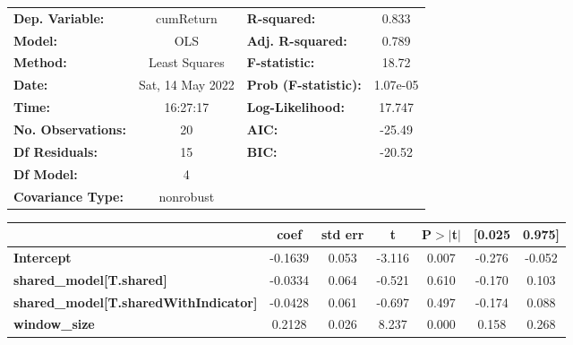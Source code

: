 \begin{center}
\begin{tabular}{lclc}
\toprule
\textbf{Dep. Variable:}                       &    cumReturn     & \textbf{  R-squared:         } &     0.833   \\
\textbf{Model:}                               &       OLS        & \textbf{  Adj. R-squared:    } &     0.789   \\
\textbf{Method:}                              &  Least Squares   & \textbf{  F-statistic:       } &     18.72   \\
\textbf{Date:}                                & Sat, 14 May 2022 & \textbf{  Prob (F-statistic):} &  1.07e-05   \\
\textbf{Time:}                                &     16:27:17     & \textbf{  Log-Likelihood:    } &    17.747   \\
\textbf{No. Observations:}                    &          20      & \textbf{  AIC:               } &    -25.49   \\
\textbf{Df Residuals:}                        &          15      & \textbf{  BIC:               } &    -20.52   \\
\textbf{Df Model:}                            &           4      & \textbf{                     } &             \\
\textbf{Covariance Type:}                     &    nonrobust     & \textbf{                     } &             \\
\bottomrule
\end{tabular}
\begin{tabular}{lcccccc}
                                              & \textbf{coef} & \textbf{std err} & \textbf{t} & \textbf{P$> |$t$|$} & \textbf{[0.025} & \textbf{0.975]}  \\
\midrule
\textbf{Intercept}                            &      -0.1639  &        0.053     &    -3.116  &         0.007        &       -0.276    &       -0.052     \\
\textbf{shared\_model[T.shared]}              &      -0.0334  &        0.064     &    -0.521  &         0.610        &       -0.170    &        0.103     \\
\textbf{shared\_model[T.sharedWithIndicator]} &      -0.0428  &        0.061     &    -0.697  &         0.497        &       -0.174    &        0.088     \\
\textbf{window\_size}                         &       0.2128  &        0.026     &     8.237  &         0.000        &        0.158    &        0.268     \\

\end{tabular}
\end{center}
